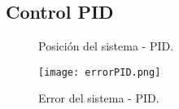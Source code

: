 \subsection{Control PID}

\begin{figure}
    \centering
    \caption{Posición del sistema - PID.}
    \label{fig:PID position}
\end{figure}

\begin{figure}
    \centering
    \texttt{[image: errorPID.png]}
    \caption{Error del sistema - PID.}
    \label{fig:PID error}
\end{figure}
